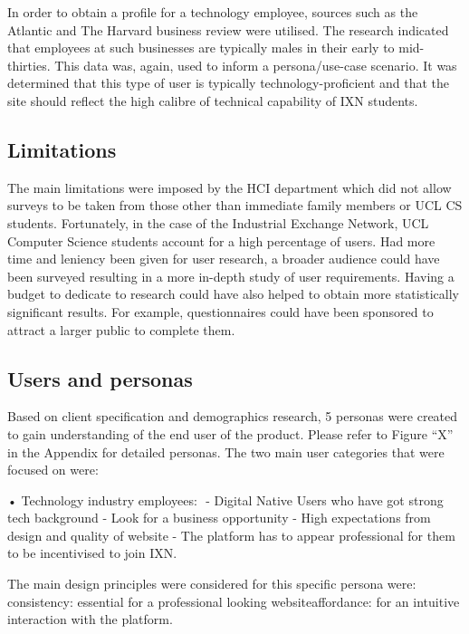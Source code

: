 \documentclass[fontsize=10pt]{extarticle}
\numberwithin{figure}{section} %
\begin{document}
In order to obtain a profile for a technology employee, sources such as
the Atlantic \cite{ps4} and The Harvard business review \cite{ps5} were
utilised. The research indicated that employees at such businesses are
typically males in their early to mid-thirties. This data was, again,
used to inform a persona/use-case scenario. It was determined that this
type of user is typically technology-proficient and that the site should
reflect the high calibre of technical capability of IXN students.

\hypertarget{limitations}{%
\subsection{Limitations}\label{limitations}}

The main limitations were imposed by the HCI department which did not
allow surveys to be taken from those other than immediate family members
or UCL CS students. Fortunately, in the case of the Industrial Exchange
Network, UCL Computer Science students account for a high percentage of
users. Had more time and leniency been given for user research, a
broader audience could have been surveyed resulting in a more in-depth
study of user requirements. Having a budget to dedicate to research
could have also helped to obtain more statistically significant results.
For example, questionnaires could have been sponsored to attract a
larger public to complete them.

\hypertarget{users-and-personas}{%
\subsection{Users and personas}\label{users-and-personas}}

Based on client specification and demographics research, 5 personas were
created to gain understanding of the end user of the product. Please
refer to Figure ``X'' in the Appendix for detailed personas. The two
main user categories that were focused on were: ​

• Technology industry employees: ​ - Digital Native Users who have got
strong tech background​ - Look for a business opportunity​ - High
expectations from design and quality of website​ - The platform has to
appear professional for them to be incentivised to join IXN​.

The main design principles were considered for this specific persona
were: ​ consistency: essential for a professional looking website​
affordance: for an intuitive interaction with the platform. ​
\end{document}
